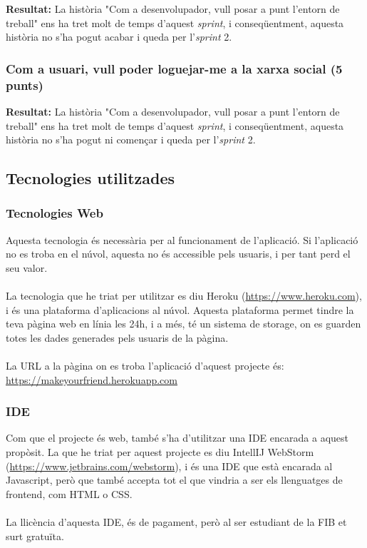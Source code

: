 \documentclass[11pt,catalan,listoffigures,listoftables]{tfgetsinf}
\begin{document}
\textcolor{costumyellow}{\textbf{Resultat:}} La història "Com a desenvolupador, vull posar a punt l'entorn de treball" ens ha tret molt de temps d'aquest \textit{sprint}, i conseqüentment, aquesta història no s'ha pogut acabar i queda per l'\textit{sprint} 2.

\subsubsection{Com a usuari, vull poder loguejar-me a la xarxa social (5 punts)}

\textcolor{costumyellow}{\textbf{Resultat:}} La història "Com a desenvolupador, vull posar a punt l'entorn de treball" ens ha tret molt de temps d'aquest \textit{sprint}, i conseqüentment, aquesta història no s'ha pogut ni començar i queda per l'\textit{sprint} 2.

\subsection{Tecnologies utilitzades}

\subsubsection{Tecnologies Web}

Aquesta tecnologia és necessària per al funcionament de l'aplicació. Si l'aplicació no es troba en el núvol, aquesta no és accessible pels usuaris, i per tant perd el seu valor. \\ \\
La tecnologia que he triat per utilitzar es diu Heroku (\url{https://www.heroku.com}), i és una plataforma d'aplicacions al núvol. Aquesta plataforma permet tindre la teva pàgina web en línia les 24h, i a més, té un sistema de storage, on es guarden totes les dades generades pels usuaris de la pàgina.\\ \\
La URL a la pàgina on es troba l'aplicació d'aquest projecte és: \\
\url{https://makeyourfriend.herokuapp.com}

\subsubsection{IDE}

Com que el projecte és web, també s'ha d'utilitzar una IDE encarada a aquest propòsit. La que he triat per aquest projecte es diu IntellIJ WebStorm (\url{https://www.jetbrains.com/webstorm}), i és una IDE que està encarada al Javascript, però que també accepta tot el que vindria a ser els llenguatges de frontend, com HTML o CSS.\\ \\
La llicència d'aquesta IDE, és de pagament, però al ser estudiant de la FIB et surt gratuïta.
\end{document}

